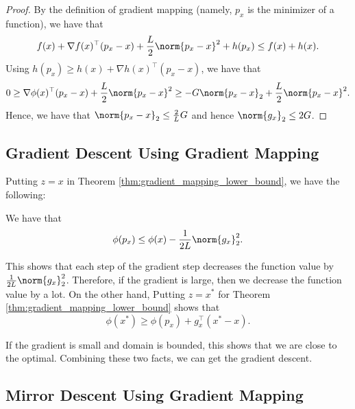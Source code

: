 \begin{proof}
By the definition of gradient mapping (namely, $p_{x}$ is the minimizer
of a function), we have that
\[
f(x)+\nabla f(x)^{\top}(p_{x}-x)+\frac{L}{2}\norm{p_{x}-x}^{2}+h(p_{x})\leq f(x)+h(x).
\]
Using $h(p_{x})\geq h(x)+\nabla h(x)^{\top}(p_{x}-x)$, we have that
\[
0\geq\nabla\phi(x)^{\top}(p_{x}-x)+\frac{L}{2}\norm{p_{x}-x}^{2}\geq-G\norm{p_{x}-x}_{2}+\frac{L}{2}\norm{p_{x}-x}^{2}.
\]
Hence, we have that $\norm{p_{x}-x}_{2}\leq\frac{2}{L}G$ and hence
$\norm{g_{x}}_{2}\leq2G$.
\end{proof}

\subsection{Gradient Descent Using Gradient Mapping}

Putting $z=x$ in Theorem \ref{thm:gradient_mapping_lower_bound},
we have the following:
\begin{lem}
\label{lem:gradient_descent_lemma}We have that
\[
\phi(p_{x})\leq\phi(x)-\frac{1}{2L}\norm{g_{x}}_{2}^{2}.
\]
\end{lem}

This shows that each step of the gradient step decreases the function
value by $\frac{1}{2L}\norm{g_{x}}_{2}^{2}$. Therefore, if the gradient
is large, then we decrease the function value by a lot. On the other
hand, Putting $z=x^{*}$ for Theorem \ref{thm:gradient_mapping_lower_bound}
shows that
\[
\phi(x^{*})\geq\phi(p_{x})+g_{x}^{\top}(x^{*}-x).
\]

If the gradient is small and domain is bounded, this shows that we
are close to the optimal. Combining these two facts, we can get the
gradient descent.

\subsection{Mirror Descent Using Gradient Mapping}

